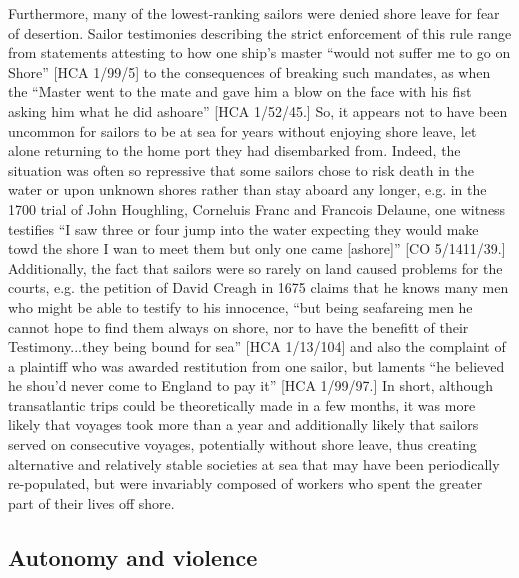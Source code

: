 Furthermore, many of the lowest-ranking sailors were denied shore leave for fear of desertion. Sailor testimonies describing the strict enforcement of this rule range from statements attesting to how one ship’s master “would not suffer me to go on Shore” [HCA 1/99/5] to the consequences of breaking such mandates, as when the “Master went to the mate and gave him a blow on the face with his fist asking him what he did ashoare” [HCA 1/52/45.] So, it appears not to have been uncommon for sailors to be at sea for years without enjoying shore leave, let alone returning to the home port they had disembarked from. Indeed, the situation was often so repressive that some sailors chose to risk death in the water or upon unknown shores rather than stay aboard any longer, e.g. in the 1700 trial of John Houghling, Corneluis Franc and Francois Delaune, one witness testifies “I saw three or four jump into the water expecting they would make towd the shore I wan to meet them but only one came [ashore]” [CO 5/1411/39.] Additionally, the fact that sailors were so rarely on land caused problems for the courts, e.g. the petition of David Creagh in 1675 claims that he knows many men who might be able to testify to his innocence, “but being seafareing men he cannot hope to find them always on shore, nor to have the benefitt of their Testimony...they being bound for sea” [HCA 1/13/104] and also the complaint of a plaintiff who was awarded restitution from one sailor, but laments “he believed he shou’d never come to England to pay it”  [HCA 1/99/97.] In short, although transatlantic trips could be theoretically made in a few months, it was more likely that voyages took more than a year and additionally likely that sailors served on consecutive voyages, potentially without shore leave, thus creating alternative and relatively stable societies at sea that may have been periodically re-populated, but were invariably composed of workers who spent the greater part of their lives off shore. 

\subsection{\textbf{Autonomy} \textbf{and} \textbf{violence}}%

